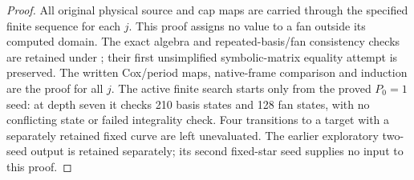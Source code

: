\begin{proof}
All original physical source and cap maps are carried through
the specified finite sequence for each \(j\). This proof assigns
no value to a fan outside its computed domain. The exact algebra
and repeated-basis/fan consistency checks are retained under
; their
first unsimplified symbolic-matrix equality attempt is preserved.
The written Cox/period maps, native-frame comparison and induction
are the proof for all \(j\). The active finite search starts only
from the proved \(P_0=1\) seed: at depth seven it checks
210 basis states and 128 fan states, with no conflicting state
or failed integrality check. Four transitions to a target with
a separately retained fixed curve are left unevaluated.
The earlier exploratory two-seed output is retained separately;
its second fixed-star seed supplies no input to this proof.
\end{proof}
